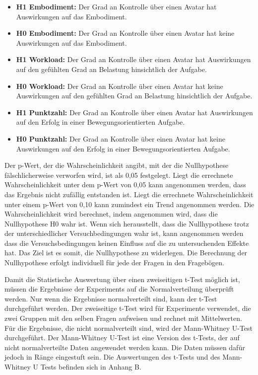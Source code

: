\begin{itemize} 

\item \textbf{H1 Embodiment:} Der Grad an Kontrolle über einen Avatar hat Auswirkungen auf das Embodiment.
\item \textbf{H0 Embodiment:} Der Grad an Kontrolle über einen Avatar hat keine Auswirkungen auf das Embodiment.

\item \textbf{H1 Workload:} Der Grad an Kontrolle über einen Avatar hat Auswirkungen auf den gefühlten Grad an Belastung hinsichtlich der Aufgabe.
\item \textbf{H0 Workload:} Der Grad an Kontrolle über einen Avatar hat keine Auswirkungen auf den gefühlten Grad an Belastung hinsichtlich der Aufgabe.

\item \textbf{H1 Punktzahl:} Der Grad an Kontrolle über einen Avatar hat Auswirkungen auf den Erfolg in einer Bewegungsorientierten Aufgabe.
\item \textbf{H0 Punktzahl:} Der Grad an Kontrolle über einen Avatar hat keine Auswirkungen auf den Erfolg in einer Bewegungsorientierten Aufgabe.

\end{itemize}

Der p-Wert, der die Wahrscheinlichkeit angibt, mit der die Nullhypothese fälschlicherweise verworfen wird, ist als 0,05 festgelegt.
Liegt die errechnete Wahrscheinlichkeit unter dem p-Wert von 0,05 kann angenommen werden, dass das Ergebnis nicht zufällig entstanden ist. Liegt die errechnete Wahrscheinlichkeit unter einem p-Wert von 0,10 kann zumindest ein Trend angenommen werden.
Die Wahrscheinlichkeit wird berechnet, indem angenommen wird, dass die Nullhypothese H0 wahr ist. Wenn sich herausstellt, dass die Nullhypothese trotz der unterschiedlicher Versuchbedingungen wahr ist, kann angenommen werden dass die Versuchsbedingungen keinen Einfluss auf die zu untersuchenden Effekte hat. Das Ziel ist es somit, die Nullhypothese zu widerlegen.
Die Berechnung der Nullhypothese erfolgt individuell für jede der Fragen in den Fragebögen.

Damit die Statistische Auswertung über einen zweiseitigen t-Test möglich ist, müssen die Ergebnisse der Experiments auf die Normalverteilung überprüft werden. Nur wenn die Ergebnisse normalverteilt sind, kann der t-Test durchgeführt werden. Der zweiseitige t-Test wird für Experimente verwendet, die zwei Gruppen mit den selben Fragen aufweisen und rechnet mit Mittelwerten. Für die Ergebnisse, die nicht normalverteilt sind, wird der Mann-Whitney U-Test durchgeführt. Der Mann-Whitney U-Test ist eine Version des t-Tests, der auf nicht normalverteilte Daten angewendet werden kann. Die Daten müssen dafür jedoch in Ränge eingestuft sein. Die Auswertungen des t-Tests und des Mann-Whitney U Tests befinden sich in Anhang B.


